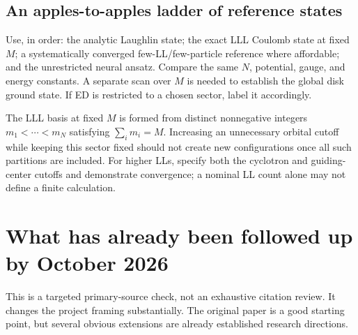 \documentclass[11pt,letterpaper]{article}
\begin{document}
\subsection{An apples-to-apples ladder of reference states}

Use, in order: the analytic Laughlin state; the exact LLL Coulomb state at fixed $M$; a systematically converged few-LL/few-particle reference where affordable; and the unrestricted neural ansatz. Compare the same $N$, potential, gauge, and energy constants. A separate scan over $M$ is needed to establish the global disk ground state. If ED is restricted to a chosen sector, label it accordingly.

The LLL basis at fixed $M$ is formed from distinct nonnegative integers $m_1<\cdots<m_N$ satisfying $\sum_i m_i=M$. Increasing an unnecessary orbital cutoff while keeping this sector fixed should not create new configurations once all such partitions are included. For higher LLs, specify both the cyclotron and guiding-center cutoffs and demonstrate convergence; a nominal LL count alone may not define a finite calculation.

\section{What has already been followed up by October 2026}
\label{sec:literature}

This is a targeted primary-source check, not an exhaustive citation review. It changes the project framing substantially. The original paper is a good starting point, but several obvious extensions are already established research directions.
\end{document}
